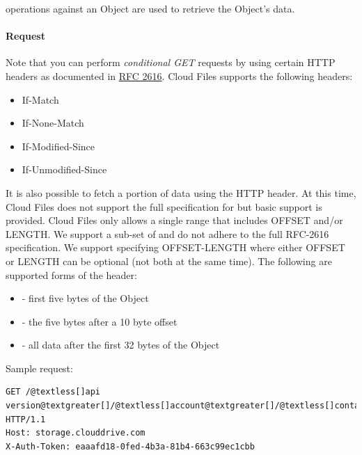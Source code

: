 \documentclass[letterpaper,10pt,english]{manual}
\begin{document}
 operations against an Object are used to retrieve the Object's
data.


\paragraph{Request}

Note that you can perform \emph{conditional GET} requests by using certain
HTTP headers as documented in \href{http://www.ietf.org/rfc/rfc2616.txt}{RFC 2616}. Cloud Files supports the
following headers:
\begin{itemize}
\item {} 
If-Match

\item {} 
If-None-Match

\item {} 
If-Modified-Since

\item {} 
If-Unmodified-Since

\end{itemize}

It is also possible to fetch a portion of data using the HTTP 
header. At this time, Cloud Files does not support the full specification
for  but basic support is provided. Cloud Files only allows a
single range that includes OFFSET and/or LENGTH. We support a sub-set of
 and do not adhere to the full RFC-2616 specification. We support
specifying OFFSET-LENGTH where either OFFSET or LENGTH can be optional
(not both at the same time). The following are supported forms of the
header:
\begin{itemize}
\item {} 
 - first five bytes of the Object

\item {} 
 - the five bytes after a 10 byte offset

\item {} 
 - all data after the first 32 bytes of the Object

\end{itemize}

Sample request:

\begin{Verbatim}[commandchars=@\[\]]
GET /@textless[]api version@textgreater[]/@textless[]account@textgreater[]/@textless[]container@textgreater[]/@textless[]object@textgreater[] HTTP/1.1
Host: storage.clouddrive.com
X-Auth-Token: eaaafd18-0fed-4b3a-81b4-663c99ec1cbb
\end{Verbatim}
\end{document}
